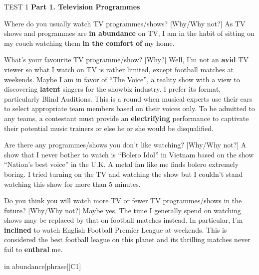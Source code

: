 \begin{glossarymc}[Cambridge 13]
    \begin{test}{TEST 1}
    \noindent
    \textbf{Part 1. Television Programmes}
    \begin{qa}{Where do you usually watch TV programmes/shows? [Why/Why not?]}
    As TV shows and programmes are \textbf{in abundance} on TV, I am in the habit of sitting on my couch watching them \textbf{in the comfort of} my home.
    \end{qa}

    \begin{qa}{What's your favourite TV programme/show? [Why?]}
    Well, I’m not an \textbf{avid} TV viewer so what I watch on TV is rather limited, except football matches at weekends. Maybe I am in favor of “The Voice”, a reality show with a view to discovering \textbf{latent} singers for the showbiz industry. I prefer its format, particularly Blind Auditions. This is a round when musical experts use their ears to select appropriate team members based on their voices only. To be admitted to any teams, a contestant must provide an \textbf{electrifying} performance to captivate their potential music trainers or else he or she would be disqualified.
    \end{qa}

    \begin{qa}{Are there any programmes/shows you don’t like watching? [Why/Why not?]}
    A show that I never bother to watch is “Bolero Idol” in Vietnam based on the show “Nation’s best voice” in the U.K. A metal fan like me finds bolero extremely boring. I tried turning on the TV and watching the show but I couldn’t stand watching this show for more than 5 minutes.
    \end{qa}

    \begin{qa}{Do you think you will watch more TV or fewer TV programmes/shows in the future? [Why/Why not?]}
    Maybe yes. The time I generally spend on watching shows may be replaced by that on football matches instead. In particular, I’m \textbf{inclined} to watch English Football Premier League at weekends. This is considered the best football league on this planet and its thrilling matches never fail to \textbf{enthral} me.
    \end{qa}

        \begin{VocabExplain}[Part 1]
            \begin{ExplainCard}{in abundance}[phrase][C1]
            \end{ExplainCard}


\end{VocabExplain}
\end{test}
\end{glossarymc}

